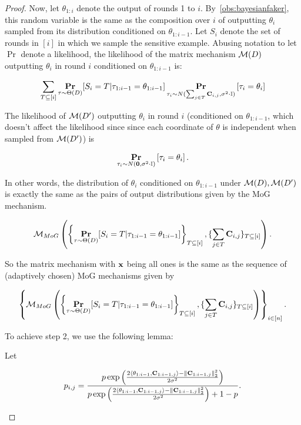 \begin{proof}
Now, let $\theta_{1:i}$ denote the output of rounds 1 to $i$. By~\cref{obs:bayesianfaker}, this random variable is the same as the composition over $i$ of outputting $\theta_i$ sampled from its distribution conditioned on $\theta_{1:i-1}$.  Let $S_i$ denote the set of rounds in $[i]$ in which we sample the sensitive example. Abusing notation to let $\Pr$ denote a likelihood, the likelihood of the matrix mechanism $\mathcal{M}(D)$ outputting $\theta_i$ in round $i$ conditioned on $\theta_{1:i-1}$ is:

\[\sum_{T \subseteq [i]} \mathop{\mathbf{Pr}}_{\tau \sim \Theta(D)}[S_i = T | \tau_{1:i-1} = \theta_{1:i-1}] \mathop{\mathbf{Pr}}_{\tau_i \sim N(\sum_{j \in T} \mathbf{C}_{i,j}, \sigma^2 \cdot \mathbb{I})}\left[\tau_i = \theta_i\right]\]

The likelihood of $\mathcal{M}(D')$ outputting $\theta_i$ in round $i$ (conditioned on $\theta_{1:i-1}$, which doesn't affect the likelihood since since each coordinate of $\theta$ is independent when sampled from $\mathcal{M}(D')$) is

\[\mathop{\mathbf{Pr}}_{\tau_i \sim N(\boldsymbol{0}, \sigma^2 \cdot \mathbb{I})}\left[\tau_i = \theta_i\right].\]

In other words, the distribution of $\theta_i$ conditioned on $\theta_{1:i-1}$ under $\mathcal{M}(D), \mathcal{M}(D')$ is exactly the same as the pairs of output distributions given by the MoG mechanism.

\[\mathcal{M}_{MoG}\left(\left\{\mathop{\mathbf{Pr}}_{\tau \sim \Theta(D)}[S_i = T | \tau_{1:i-1} = \theta_{1:i-1}]\right\}_{T \subseteq [i]}, \{\sum_{j \in T} \mathbf{C}_{i, j} \}_{T \subseteq [i]}\right).\]

So the matrix mechanism with $\mathbf{x}$ being all ones is the same as the sequence of (adaptively chosen) MoG mechanisms given by

\[\left\{\mathcal{M}_{MoG}\left(\left\{\mathop{\mathbf{Pr}}_{\tau \sim \Theta(D)}[S_i = T | \tau_{1:i-1} = \theta_{1:i-1}]\right\}_{T \subseteq [i]}, \{\sum_{j \in T} \mathbf{C}_{i, j} \}_{T \subseteq [i]}\right)\right\}_{i \in [n]}.\]

 To achieve step 2, we use the following lemma:

\begin{lem}\label{pmog-dominance}
Let

\[p_{i,j} = \frac{p \exp\left(\frac{2 \langle \theta_{1:i-1}, \mathbf{C}_{1:i-1, j}\rangle - \left\|\mathbf{C}_{1:i-1, j}\right\|_2^2}{2\sigma^2}\right)}{p \exp\left(\frac{2 \langle \theta_{1:i-1}, \mathbf{C}_{1:i-1, j}\rangle - \left\|\mathbf{C}_{1:i-1, j}\right\|_2^2}{2\sigma^2}\right) + 1 - p}.\]


\end{lem}
\end{proof}
